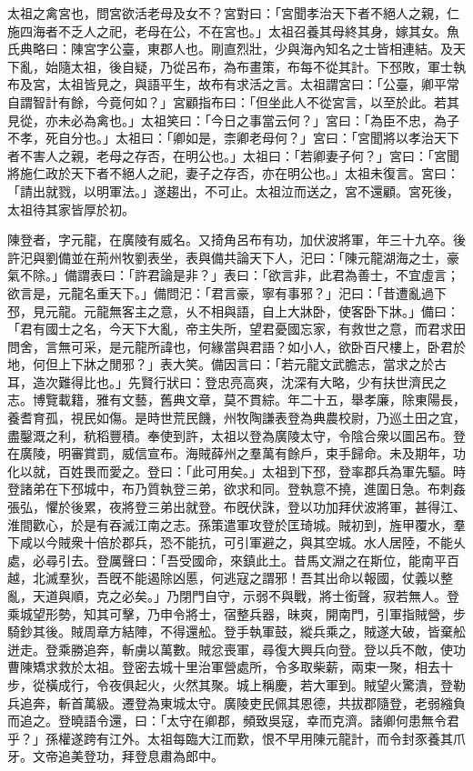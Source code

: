 \begin{pinyinscope}
太祖之禽宮也，問宮欲活老母及女不？宮對曰：「宮聞孝治天下者不絕人之親，仁施四海者不乏人之祀，老母在公，不在宮也。」太祖召養其母終其身，嫁其女。魚氏典略曰：陳宮字公臺，東郡人也。剛直烈壯，少與海內知名之士皆相連結。及天下亂，始隨太祖，後自疑，乃從呂布，為布畫策，布每不從其計。下邳敗，軍士執布及宮，太祖皆見之，與語平生，故布有求活之言。太祖謂宮曰：「公臺，卿平常自謂智計有餘，今竟何如？」宮顧指布曰：「但坐此人不從宮言，以至於此。若其見從，亦未必為禽也。」太祖笑曰：「今日之事當云何？」宮曰：「為臣不忠，為子不孝，死自分也。」太祖曰：「卿如是，柰卿老母何？」宮曰：「宮聞將以孝治天下者不害人之親，老母之存否，在明公也。」太祖曰：「若卿妻子何？」宮曰：「宮聞將施仁政於天下者不絕人之祀，妻子之存否，亦在明公也。」太祖未復言。宮曰：「請出就戮，以明軍法。」遂趨出，不可止。太祖泣而送之，宮不還顧。宮死後，太祖待其家皆厚於初。

陳登者，字元龍，在廣陵有威名。又掎角呂布有功，加伏波將軍，年三十九卒。後許汜與劉備並在荊州牧劉表坐，表與備共論天下人，汜曰：「陳元龍湖海之士，豪氣不除。」備謂表曰：「許君論是非？」表曰：「欲言非，此君為善士，不宜虛言；欲言是，元龍名重天下。」備問汜：「君言豪，寧有事邪？」汜曰：「昔遭亂過下邳，見元龍。元龍無客主之意，乆不相與語，自上大牀卧，使客卧下牀。」備曰：「君有國士之名，今天下大亂，帝主失所，望君憂國忘家，有救世之意，而君求田問舍，言無可采，是元龍所諱也，何緣當與君語？如小人，欲卧百尺樓上，卧君於地，何但上下牀之閒邪？」表大笑。備因言曰：「若元龍文武膽志，當求之於古耳，造次難得比也。」先賢行狀曰：登忠亮高爽，沈深有大略，少有扶世濟民之志。博覽載籍，雅有文藝，舊典文章，莫不貫綜。年二十五，舉孝廉，除東陽長，養耆育孤，視民如傷。是時世荒民饑，州牧陶謙表登為典農校尉，乃巡土田之宜，盡鑿溉之利，秔稻豐積。奉使到許，太祖以登為廣陵太守，令陰合衆以圖呂布。登在廣陵，明審賞罰，威信宣布。海賊薛州之羣萬有餘戶，束手歸命。未及期年，功化以就，百姓畏而愛之。登曰：「此可用矣。」太祖到下邳，登率郡兵為軍先驅。時登諸弟在下邳城中，布乃質執登三弟，欲求和同。登執意不撓，進圍日急。布刺姦張弘，懼於後累，夜將登三弟出就登。布旣伏誅，登以功加拜伏波將軍，甚得江、淮間歡心，於是有吞滅江南之志。孫策遣軍攻登於匡琦城。賊初到，旌甲覆水，羣下咸以今賊衆十倍於郡兵，恐不能抗，可引軍避之，與其空城。水人居陸，不能乆處，必尋引去。登厲聲曰：「吾受國命，來鎮此土。昔馬文淵之在斯位，能南平百越，北滅羣狄，吾旣不能遏除凶慝，何逃寇之謂邪！吾其出命以報國，仗義以整亂，天道與順，克之必矣。」乃閉門自守，示弱不與戰，將士銜聲，寂若無人。登乘城望形勢，知其可擊，乃申令將士，宿整兵器，昧爽，開南門，引軍指賊營，步騎鈔其後。賊周章方結陣，不得還舩。登手執軍鼓，縱兵乘之，賊遂大破，皆棄舩迸走。登乘勝追奔，斬虜以萬數。賊忿喪軍，尋復大興兵向登。登以兵不敵，使功曹陳矯求救於太祖。登密去城十里治軍營處所，令多取柴薪，兩束一聚，相去十步，從橫成行，令夜俱起火，火然其聚。城上稱慶，若大軍到。賊望火驚潰，登勒兵追奔，斬首萬級。遷登為東城太守。廣陵吏民佩其恩德，共拔郡隨登，老弱繈負而追之。登曉語令還，曰：「太守在卿郡，頻致吳寇，幸而克濟。諸卿何患無令君乎？」孫權遂跨有江外。太祖每臨大江而歎，恨不早用陳元龍計，而令封豕養其爪牙。文帝追美登功，拜登息肅為郎中。


\end{pinyinscope}